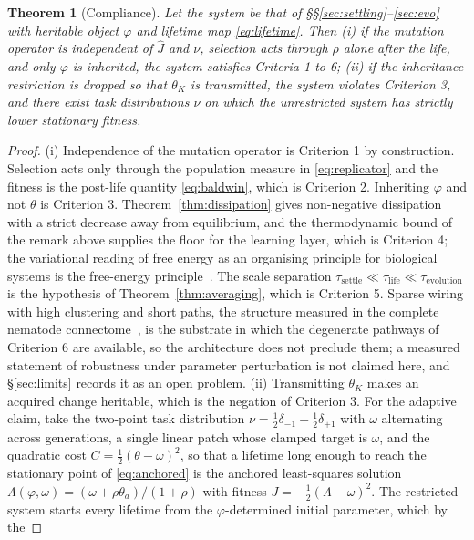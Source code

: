 \documentclass[11pt]{article}
\newtheorem{theorem}{Theorem}
\theoremstyle{definition}
\theoremstyle{remark}
\begin{document}
\begin{theorem}[Compliance]
\label{thm:compliance}
Let the system be that of \S\S\ref{sec:settling}--\ref{sec:evo} with heritable object $\varphi$ and
lifetime map \eqref{eq:lifetime}. Then (i) if the mutation operator is independent of $\hat J$ and
$\nu$, selection acts through $\rho$ alone after the life, and only $\varphi$ is inherited, the system
satisfies Criteria 1 to 6; (ii) if the inheritance restriction is dropped so that $\theta_K$ is
transmitted, the system violates Criterion 3, and there exist task distributions $\nu$ on which the
unrestricted system has strictly lower stationary fitness.
\end{theorem}
\begin{proof}
(i) Independence of the mutation operator is Criterion 1 by construction. Selection acts only through
the population measure in \eqref{eq:replicator} and the fitness is the post-life quantity
\eqref{eq:baldwin}, which is Criterion 2. Inheriting $\varphi$ and not $\theta$ is Criterion 3.
Theorem~\ref{thm:dissipation} gives non-negative dissipation with a strict decrease away from
equilibrium, and the thermodynamic bound of the remark above supplies the floor for the learning
layer, which is Criterion 4; the variational reading of free energy as an organising principle for
biological systems is the free-energy principle~\cite{friston}. The scale separation $\tau_{\text{settle}}\ll\tau_{\text{life}}\ll
\tau_{\text{evolution}}$ is the hypothesis of Theorem~\ref{thm:averaging}, which is Criterion 5.
Sparse wiring with high clustering and short paths, the structure measured in the complete
nematode connectome~\cite{connectome}, is the substrate in which the degenerate pathways of
Criterion 6 are available, so the architecture does not preclude them; a measured statement of
robustness under parameter perturbation is not claimed here, and \S\ref{sec:limits} records it as an
open problem.
(ii) Transmitting $\theta_K$ makes an acquired change heritable, which is the negation of Criterion 3.
For the adaptive claim, take the two-point task distribution $\nu=\tfrac12\delta_{-1}+\tfrac12\delta_{+1}$
with $\omega$ alternating across generations, a single linear patch whose clamped target is $\omega$, and
the quadratic cost $C=\tfrac12(\theta-\omega)^2$, so that a lifetime long enough to reach the stationary
point of \eqref{eq:anchored} is the anchored least-squares solution
$\Lambda(\varphi,\omega)=(\omega+\rho\theta_a)/(1+\rho)$ with fitness $J=-\tfrac12(\Lambda-\omega)^2$. The
restricted system starts every lifetime from the $\varphi$-determined initial parameter, which by the

\end{proof}
\end{document}
